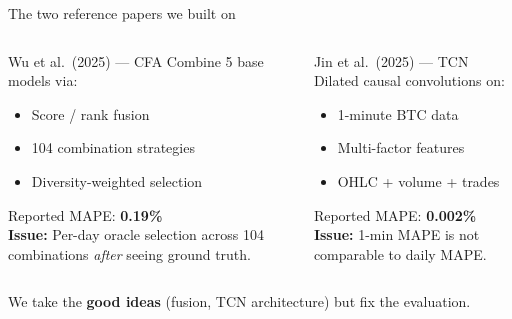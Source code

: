 \documentclass[aspectratio=169]{beamer}
\begin{document}
\begin{frame}{The two reference papers we built on}
\begin{columns}[T,onlytextwidth]
\begin{block}{Wu et al.\ (2025) --- CFA}
Combine 5 base models via:
\begin{itemize}\footnotesize
  \item Score / rank fusion
  \item 104 combination strategies
  \item Diversity-weighted selection
\end{itemize}
Reported MAPE: \textbf{0.19\%}
\vspace{0.2cm}
\\ \textcolor{accentred}{\textbf{Issue:}} Per-day oracle selection across 104 combinations \emph{after} seeing ground truth.
\end{block}

\begin{block}{Jin et al.\ (2025) --- TCN}
Dilated causal convolutions on:
\begin{itemize}\small
  \item 1-minute BTC data
  \item Multi-factor features
  \item OHLC + volume + trades
\end{itemize}
Reported MAPE: \textbf{0.002\%}
\vspace{0.2cm}
\\ \textcolor{accentred}{\textbf{Issue:}} 1-min MAPE is not comparable to daily MAPE.
\end{block}
\end{columns}

\vspace{0.3cm}
\centering
\small We take the \textbf{good ideas} (fusion, TCN architecture) but fix the evaluation.
\end{frame}
\end{document}
